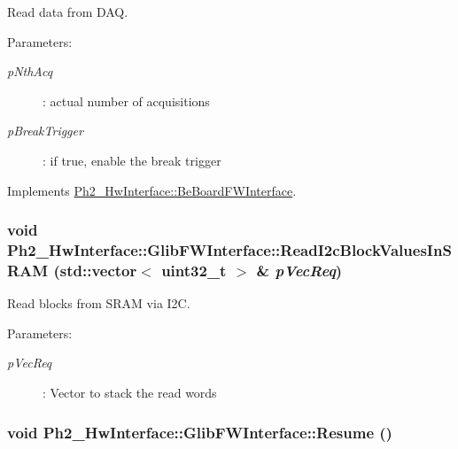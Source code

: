 Read data from DAQ. 

\begin{Desc}
\item[Parameters:]
\begin{description}
\item[{\em p\-Nth\-Acq}]: actual number of acquisitions \item[{\em p\-Break\-Trigger}]: if true, enable the break trigger \end{description}
\end{Desc}


Implements \hyperlink{class_ph2___hw_interface_1_1_be_board_f_w_interface_e5e2d8bc8a89d205067b230ec7d9d098}{Ph2\_\-Hw\-Interface::Be\-Board\-FWInterface}.\hypertarget{class_ph2___hw_interface_1_1_glib_f_w_interface_e067b85741fbb52c30a946d5f4f2691b}{
\subsubsection[ReadI2cBlockValuesInSRAM]{\setlength{\rightskip}{0pt plus 5cm}void Ph2\_\-Hw\-Interface::Glib\-FWInterface::Read\-I2c\-Block\-Values\-In\-SRAM (std::vector$<$ uint32\_\-t $>$ \& {\em p\-Vec\-Req})}}
\label{class_ph2___hw_interface_1_1_glib_f_w_interface_e067b85741fbb52c30a946d5f4f2691b}


Read blocks from SRAM via I2C. 

\begin{Desc}
\item[Parameters:]
\begin{description}
\item[{\em p\-Vec\-Req}]: Vector to stack the read words \end{description}
\end{Desc}
\hypertarget{class_ph2___hw_interface_1_1_glib_f_w_interface_edd3abfb576016701da27fabc975ac13}{
\subsubsection[Resume]{\setlength{\rightskip}{0pt plus 5cm}void Ph2\_\-Hw\-Interface::Glib\-FWInterface::Resume ()}}
\label{class_ph2___hw_interface_1_1_glib_f_w_interface_edd3abfb576016701da27fabc975ac13}


